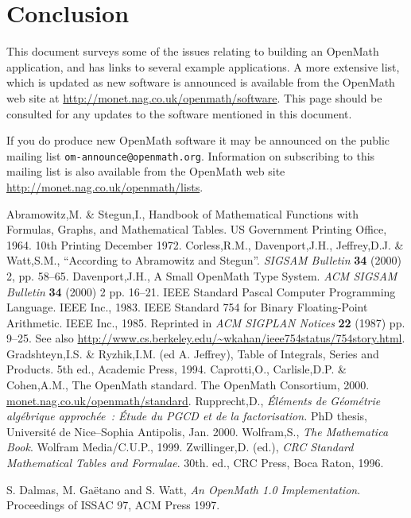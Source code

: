 \documentclass[report,keylogo]{openmath}
\begin{document}
\section{Conclusion}
This document surveys some of the issues relating to building an OpenMath
application, and has links to several example applications.
A more extensive list, which is updated as new software is announced
is available from the OpenMath web site at
\url{http://monet.nag.co.uk/openmath/software}.
This page should be consulted for any updates to the software mentioned
in this document.

If you do produce new OpenMath software it may be announced on the
public mailing list \texttt{om-announce@openmath.org}. Information on
subscribing to this mailing list is also available from the OpenMath web site 
\url{http://monet.nag.co.uk/openmath/lists}.

\let\oldsec\section
\def\section*{\oldsec}
\begin{thebibliography}{9}
Abramowitz,M. \& Stegun,I.,
Handbook of Mathematical Functions with Formulas, Graphs, and Mathematical
Tables.
US Government Printing Office, 1964.
10th Printing December 1972.
Corless,R.M., Davenport,J.H., Jeffrey,D.J. \& Watt,S.M.,
``According to Abramowitz and Stegun''.
{\it SIGSAM Bulletin\/} {\bf34} (2000) 2, pp. 58--65.
Davenport,J.H.,
A Small OpenMath Type System.
{\it ACM SIGSAM Bulletin\/} {\bf34} (2000) 2 pp. 16--21.
IEEE Standard Pascal Computer Programming Language.
IEEE Inc., 1983.
IEEE Standard 754 for Binary Floating-Point Arithmetic.
IEEE Inc., 1985.
Reprinted in {\it ACM SIGPLAN Notices\/} {\bf22} (1987) pp. 9--25.
See also
\url{http://www.cs.berkeley.edu/~wkahan/ieee754status/754story.html}.
Gradshteyn,I.S. \& Ryzhik,I.M. (ed A. Jeffrey),
Table of Integrals, Series and Products.
5th ed., Academic Press, 1994.
Caprotti,O., Carlisle,D.P. \& Cohen,A.M., The OpenMath
standard. The OpenMath Consortium, 2000.
\url{monet.nag.co.uk/openmath/standard}.
Rupprecht,D.,
{\it \'El\'ements de G\'eom\'etrie alg\'ebrique approch\'ee~:
\'Etude du PGCD et de la factorisation.}
PhD thesis, Universit\'e de Nice--Sophia Antipolis, Jan. 2000.
Wolfram,S.,
{\it The Mathematica Book\/}.
Wolfram Media/C.U.P., 1999.
Zwillinger,D. (ed.),
{\it CRC Standard Mathematical Tables and Formulae\/}.
30th. ed., CRC Press, Boca Raton, 1996.

S. Dalmas, M. Ga{\"e}tano and S. Watt,
{\it An OpenMath 1.0 Implementation}.
Proceedings of ISSAC 97, ACM Press 1997.
\end{thebibliography}
\end{document}
